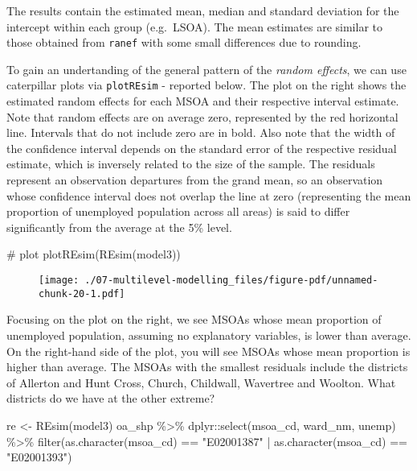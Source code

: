 \documentclass[
  letterpaper,
  krantz2]{style/krantz}
\newenvironment{Shaded}{\begin{snugshade}}{\end{snugshade}}
\newcommand{\CommentTok}[1]{\textcolor[rgb]{0.37,0.37,0.37}{#1}}
\newcommand{\FunctionTok}[1]{\textcolor[rgb]{0.28,0.35,0.67}{#1}}
\newcommand{\NormalTok}[1]{\textcolor[rgb]{0.00,0.23,0.31}{#1}}
\newcommand{\OtherTok}[1]{\textcolor[rgb]{0.00,0.23,0.31}{#1}}
\newcommand{\SpecialCharTok}[1]{\textcolor[rgb]{0.37,0.37,0.37}{#1}}
\newcommand{\StringTok}[1]{\textcolor[rgb]{0.13,0.47,0.30}{#1}}
\begin{document}
The results contain the estimated mean, median and standard deviation
for the intercept within each group (e.g.~LSOA). The mean estimates are
similar to those obtained from \texttt{ranef} with some small
differences due to rounding.

To gain an undertanding of the general pattern of the \emph{random
effects}, we can use caterpillar plots via \texttt{plotREsim} - reported
below. The plot on the right shows the estimated random effects for each
MSOA and their respective interval estimate. Note that random effects
are on average zero, represented by the red horizontal line. Intervals
that do not include zero are in bold. Also note that the width of the
confidence interval depends on the standard error of the respective
residual estimate, which is inversely related to the size of the sample.
The residuals represent an observation departures from the grand mean,
so an observation whose confidence interval does not overlap the line at
zero (representing the mean proportion of unemployed population across
all areas) is said to differ significantly from the average at the 5\%
level.

\begin{Shaded}
\begin{Highlighting}[]
\CommentTok{\# plot}
\FunctionTok{plotREsim}\NormalTok{(}\FunctionTok{REsim}\NormalTok{(model3)) }
\end{Highlighting}
\end{Shaded}

\begin{figure}[H]

{\centering \texttt{[image: ./07-multilevel-modelling\_files/figure-pdf/unnamed-chunk-20-1.pdf]}

}

\end{figure}

Focusing on the plot on the right, we see MSOAs whose mean proportion of
unemployed population, assuming no explanatory variables, is lower than
average. On the right-hand side of the plot, you will see MSOAs whose
mean proportion is higher than average. The MSOAs with the smallest
residuals include the districts of Allerton and Hunt Cross, Church,
Childwall, Wavertree and Woolton. What districts do we have at the other
extreme?

\begin{Shaded}
\begin{Highlighting}[]
\NormalTok{re }\OtherTok{\textless{}{-}} \FunctionTok{REsim}\NormalTok{(model3)}
\NormalTok{oa\_shp }\SpecialCharTok{\%\textgreater{}\%}\NormalTok{ dplyr}\SpecialCharTok{::}\FunctionTok{select}\NormalTok{(msoa\_cd, ward\_nm, unemp) }\SpecialCharTok{\%\textgreater{}\%}
    \FunctionTok{filter}\NormalTok{(}\FunctionTok{as.character}\NormalTok{(msoa\_cd) }\SpecialCharTok{==} \StringTok{"E02001387"} \SpecialCharTok{|} \FunctionTok{as.character}\NormalTok{(msoa\_cd) }\SpecialCharTok{==} \StringTok{"E02001393"}\NormalTok{)}
\end{Highlighting}
\end{Shaded}
\end{document}
